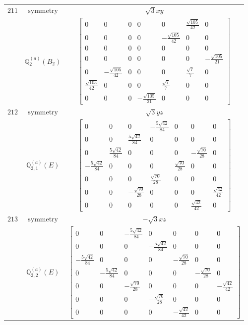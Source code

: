 \documentclass[fleqn,8pt,landscape]{jsarticle}
\begin{document}
\begin{longtable}{ccc}
$ 211 $ & $ \text{symmetry} $ & $ \sqrt{3} x y $ \\
$  $ & $ \mathbb{Q}_{2}^{(a)}(B_{2}) $ & $ \begin{bmatrix} 0 & 0 & 0 & 0 & 0 & \frac{\sqrt{105}}{42} & 0 \\ 0 & 0 & 0 & 0 & - \frac{\sqrt{105}}{42} & 0 & 0 \\ 0 & 0 & 0 & 0 & 0 & 0 & 0 \\ 0 & 0 & 0 & 0 & 0 & 0 & - \frac{\sqrt{105}}{21} \\ 0 & - \frac{\sqrt{105}}{42} & 0 & 0 & 0 & \frac{\sqrt{7}}{7} & 0 \\ \frac{\sqrt{105}}{42} & 0 & 0 & 0 & \frac{\sqrt{7}}{7} & 0 & 0 \\ 0 & 0 & 0 & - \frac{\sqrt{105}}{21} & 0 & 0 & 0 \end{bmatrix} $ \\ \hline
$ 212 $ & $ \text{symmetry} $ & $ \sqrt{3} y z $ \\
$  $ & $ \mathbb{Q}_{2,1}^{(a)}(E) $ & $ \begin{bmatrix} 0 & 0 & 0 & - \frac{5 \sqrt{42}}{84} & 0 & 0 & 0 \\ 0 & 0 & \frac{5 \sqrt{42}}{84} & 0 & 0 & 0 & 0 \\ 0 & \frac{5 \sqrt{42}}{84} & 0 & 0 & 0 & - \frac{\sqrt{70}}{28} & 0 \\ - \frac{5 \sqrt{42}}{84} & 0 & 0 & 0 & \frac{\sqrt{70}}{28} & 0 & 0 \\ 0 & 0 & 0 & \frac{\sqrt{70}}{28} & 0 & 0 & 0 \\ 0 & 0 & - \frac{\sqrt{70}}{28} & 0 & 0 & 0 & \frac{\sqrt{42}}{42} \\ 0 & 0 & 0 & 0 & 0 & \frac{\sqrt{42}}{42} & 0 \end{bmatrix} $ \\ \hline
$ 213 $ & $ \text{symmetry} $ & $ - \sqrt{3} x z $ \\
$  $ & $ \mathbb{Q}_{2,2}^{(a)}(E) $ & $ \begin{bmatrix} 0 & 0 & - \frac{5 \sqrt{42}}{84} & 0 & 0 & 0 & 0 \\ 0 & 0 & 0 & - \frac{5 \sqrt{42}}{84} & 0 & 0 & 0 \\ - \frac{5 \sqrt{42}}{84} & 0 & 0 & 0 & - \frac{\sqrt{70}}{28} & 0 & 0 \\ 0 & - \frac{5 \sqrt{42}}{84} & 0 & 0 & 0 & - \frac{\sqrt{70}}{28} & 0 \\ 0 & 0 & - \frac{\sqrt{70}}{28} & 0 & 0 & 0 & - \frac{\sqrt{42}}{42} \\ 0 & 0 & 0 & - \frac{\sqrt{70}}{28} & 0 & 0 & 0 \\ 0 & 0 & 0 & 0 & - \frac{\sqrt{42}}{42} & 0 & 0 \end{bmatrix} $ \\ \hline

\end{longtable}
\end{document}
